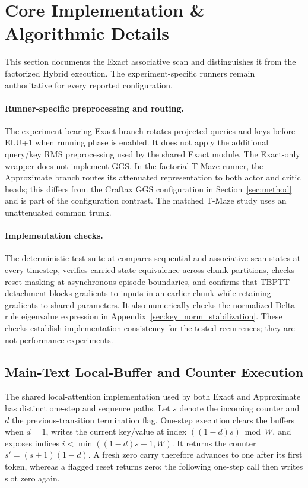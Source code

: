 \section{Core Implementation \& Algorithmic Details}
\label{app:implementation_details}

This section documents the Exact associative scan and distinguishes it from the factorized Hybrid execution. The experiment-specific runners remain authoritative for every reported configuration.

\paragraph{Runner-specific preprocessing and routing.}
The experiment-bearing Exact branch rotates projected queries and keys before ELU+1 when running phase is enabled. It does not apply the additional query/key RMS preprocessing used by the shared Exact module. The Exact-only wrapper does not implement GGS. In the factorial T-Maze runner, the Approximate branch routes its attenuated representation to both actor and critic heads; this differs from the Craftax GGS configuration in Section~\ref{sec:method} and is part of the configuration contrast. The matched T-Maze study uses an unattenuated common trunk.

\paragraph{Implementation checks.} The deterministic test suite at  compares sequential and associative-scan states at every timestep, verifies carried-state equivalence across chunk partitions, checks reset masking at asynchronous episode boundaries, and confirms that TBPTT detachment blocks gradients to inputs in an earlier chunk while retaining gradients to shared parameters. It also numerically checks the normalized Delta-rule eigenvalue expression in Appendix~\ref{sec:key_norm_stabilization}. These checks establish implementation consistency for the tested recurrences; they are not performance experiments.

\subsection{Main-Text Local-Buffer and Counter Execution}
\label{app:original_local_execution}
The shared local-attention implementation used by both Exact and Approximate
has distinct one-step and sequence paths. Let $s$ denote the incoming counter
and $d$ the previous-transition termination flag. One-step execution clears the
buffers when $d=1$, writes the current key/value at index $((1-d)s)\bmod W$,
and exposes indices $i<\min((1-d)s+1,W)$. It returns the counter
$s'=(s+1)(1-d)$. A fresh zero carry therefore advances to one after its first
token, whereas a flagged reset returns zero; the following one-step call then
writes slot zero again.

